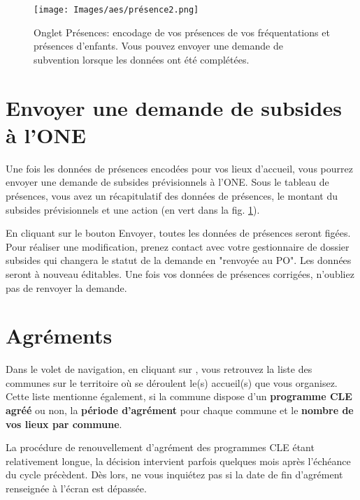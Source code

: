 \begin{figure}[htbp]
    \centering
    \texttt{[image: Images/aes/présence2.png]}
    \caption{Onglet Présences: encodage de vos présences de vos fréquentations et présences d'enfants. Vous pouvez envoyer une demande de subvention lorsque les données ont été complétées.}
    \label{fig:aes_présences}
\end{figure}


\section{Envoyer une demande de subsides à l'ONE}
Une fois les données de présences encodées pour vos lieux d'accueil, vous pourrez envoyer une demande de subsides prévisionnels à l'ONE. Sous le tableau de présences, vous avez un récapitulatif des données de présences, le montant du subsides prévisionnels et une action  (en \textcolor{vert}{vert} dans la fig. \ref{fig:aes_présences}). 


\begin{remarque}
En cliquant sur le bouton Envoyer, toutes les données de présences seront figées. Pour réaliser une modification, prenez contact avec votre gestionnaire de dossier subsides qui changera le statut de la demande en "renvoyée au PO". Les données seront à nouveau éditables. Une fois vos données de présences corrigées, n'oubliez pas de renvoyer la demande. 
\end{remarque}


\section{Agréments}
Dans le volet de navigation, en cliquant sur , vous retrouvez la liste des communes sur le territoire où se déroulent le(s) accueil(s) que vous organisez.
Cette liste mentionne également, si la commune dispose d’un \textbf{programme CLE agréé} ou non, la \textbf{période d’agrément} pour chaque commune et le \textbf{nombre de vos lieux par commune}.

\begin{remarque}
La procédure de renouvellement d’agrément des programmes CLE étant relativement longue, la décision intervient parfois quelques mois après l’échéance du cycle précèdent. Dès lors, ne vous inquiétez pas si la date de fin d’agrément renseignée à l’écran est dépassée.
\end{remarque}